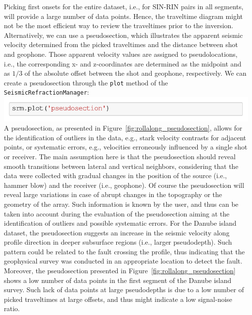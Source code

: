 \documentclass[a4paper,fleqn]{cas-sc}
\begin{document}
Picking first onsets for the entire dataset, i.e., for SIN-RIN pairs in all segments, will provide a large number of data points. Hence, the traveltime diagram might not be the most efficient way to review the traveltimes prior to the inversion. Alternatively, we can use a pseudosection, which illustrates the apparent seismic velocity determined from the picked traveltimes and the distance between shot and geophone. Those apparent velocity values are assigned to pseudolocations, i.e., the corresponding x- and z-coordinates are determined as the midpoint and as $1/3$ of the absolute offset between the shot and geophone, respectively.
We can create a pseudosection through the \texttt{plot} method of the \texttt{SeismicRefractionManager}:
\newline
\includegraphics[width=.5\textwidth]{./figures/plotpseudosection_danube.pdf}
\newline
A pseudosection, as presented in Figure~\ref{fig:rollalong_pseudosection}, allows for the identification of outliers in the data, e.g., stark velocity contrasts for adjacent points, or systematic errors, e.g., velocities erroneously influenced by a single shot or receiver. The main assumption here is that the pseudosection should reveal smooth transitions between lateral and vertical neighbors, considering that the data were collected with gradual changes in the position of the source (i.e., hammer blow) and the receiver (i.e., geophone). Of course the pseudosection will reveal large variations in case of abrupt changes in the topography or the geometry of the array. Such information is known by the user, and thus can be taken into account during the evaluation of the pseudosection aiming at the identification of outliers and possible systematic errors.
For the Danube island dataset, the pseudosection suggests an increase in the seismic velocity along profile direction in deeper subsurface regions (i.e., larger pseudodepth). Such pattern could be related to the fault crossing the profile, thus indicating that the geophysical survey was conducted in an appropriate location to detect the fault.
Moreover, the pseudosection presented in Figure~\ref{fig:rollalong_pseudosection} shows a low number of data points in the first segment of the Danube island survey. Such lack of data points at large pseudodepths is due to a low number of picked traveltimes at large offsets, and thus might indicate a low signal-noise ratio.
\end{document}
